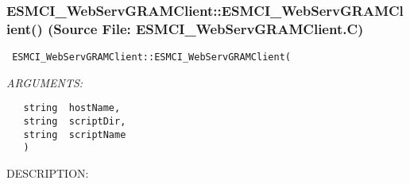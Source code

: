  
\setlength{\oldparskip}{\parskip}
\setlength{\parskip}{1.5ex}
\setlength{\oldparindent}{\parindent}
\setlength{\parindent}{0pt}
\setlength{\oldbaselineskip}{\baselineskip}
\setlength{\baselineskip}{11pt}
 
\def\bv{\begin{verbatim}}
\def\ev{\end{verbatim}}
\def\be{\begin{equation}}
\def\ee{\end{equation}}
\def\bea{\begin{eqnarray}}
\def\eea{\end{eqnarray}}
\def\bi{\begin{itemize}}
\def\ei{\end{itemize}}
\def\bn{\begin{enumerate}}
\def\en{\end{enumerate}}
\def\bd{\begin{description}}
\def\ed{\end{description}}
\def\({\left (}
\def\){\right )}
\def\[{\left [}
\def\]{\right ]}
\def\<{\left  \langle}
\def\>{\right \rangle}
\def\cI{{\cal I}}
\def\diag{\mathop{\rm diag}}
\def\tr{\mathop{\rm tr}}


 
\subsubsection{ESMCI\_WebServGRAMClient::ESMCI\_WebServGRAMClient() (Source File: ESMCI\_WebServGRAMClient.C)}


  
\begin{verbatim} ESMCI_WebServGRAMClient::ESMCI_WebServGRAMClient(\end{verbatim}{\em ARGUMENTS:}
\begin{verbatim}   string  hostName,
   string  scriptDir,
   string  scriptName
   )\end{verbatim}
{\sf DESCRIPTION:\\ }


